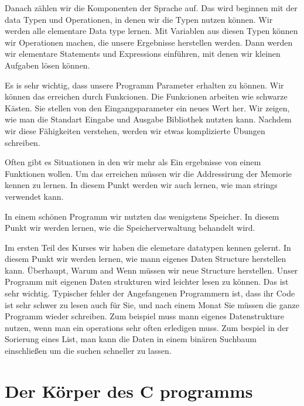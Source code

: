 \documentclass{article}[12pt]
\begin{document}
Danach z\"ahlen wir die Komponenten der Sprache auf. Das wird beginnen mit der data Typen und Operationen, in denen wir 
die Typen nutzen k\"onnen. Wir werden alle elementare Data type lernen. Mit Variablen aus diesen Typen k\"onnen wir Operationen machen, 
die unsere Ergebnisse herstellen werden. Dann werden wir elementare Statements und Expressions einf\"uhren, mit denen 
wir kleinen Aufgaben l\"osen k\"onnen. 
  
Es is sehr wichtig, dass unsere Programm Parameter erhalten zu k\"onnen. Wir k\"onnen das erreichen durch Funkcionen.
Die Funkcionen arbeiten wie schwarze K\"asten. Sie stellen von den Eingangsparameter ein neues Wert her. Wir zeigen, 
wie man die Standart Eingabe und Ausgabe Bibliothek nutzten kann. Nachdem wir diese F\"ahigkeiten verstehen, werden wir etwas
komplizierte \"Ubungen schreiben.

Often gibt es Situationen in den wir mehr als Ein ergebnisse von einem Funktionen wollen. Um das erreichen
m\"ussen wir die Addressirung der Memorie kennen zu lernen. In diesem Punkt werden wir auch lernen, wie man 
strings verwendet kann.

In einem sch\"onen Programm wir nutzten das wenigstens Speicher. In diesem Punkt wir werden lernen, 
wie die Speicherverwaltung behandelt wird.

Im ersten Teil des Kurses wir haben die elemetare datatypen kennen gelernt. In diesem Punkt wir
werden lernen, wie mann eigenes Daten Structure herstellen kann. Überhaupt, Warum and Wenn müssen wir neue Structure herstellen.
Unser Programm mit eigenen Daten strukturen wird leichter lesen zu können. Das ist sehr wichtig. Typischer fehler der Angefangenen Programmern
ist, dass ihr Code ist sehr schwer zu lesen auch für Sie, und nach einem Monat Sie müssen die ganze Programm
wieder schreiben. Zum beispiel muss mann eigenes Datenstrukture nutzen, wenn man ein operations sehr often erledigen muss.
Zum bespiel in der Sorierung eines List, man kann die Daten in einem binären Suchbaum einschließen um die suchen schneller zu lassen.

\section{Der Körper des C programms}
\end{document}
